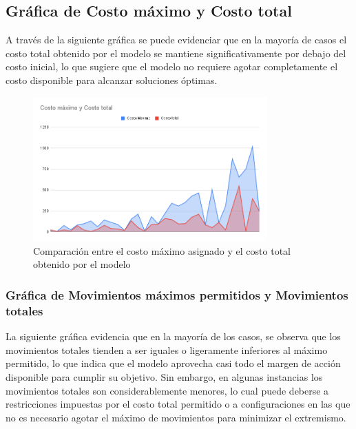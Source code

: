 \documentclass[11pt,letter]{article}
\begin{document}
\subsection{Gráfica de Costo máximo y Costo total}

A través de la siguiente gráfica se puede evidenciar que en la mayoría de casos el costo total obtenido por el modelo se mantiene significativamente por debajo del costo inicial, lo que sugiere que el modelo no requiere agotar completamente el costo disponible para alcanzar soluciones óptimas.

\begin{figure}[H]
    \centering
    \includegraphics[width=0.8\textwidth]{resources/costomaximoycostototal.png}
    \caption{Comparación entre el costo máximo asignado y el costo total obtenido por el modelo}
\end{figure}


\subsubsection*{Gráfica de Movimientos máximos permitidos y Movimientos totales}
La siguiente gráfica evidencia  que en la mayoría de los casos, se observa que los movimientos totales tienden a ser iguales o ligeramente inferiores al máximo permitido, lo que indica que el modelo aprovecha casi todo el margen de acción disponible para cumplir su objetivo. Sin embargo, en algunas instancias los movimientos totales son considerablemente menores, lo cual puede deberse a restricciones impuestas por el costo total permitido o a configuraciones en las que no es necesario agotar el máximo de movimientos para minimizar el extremismo. 
\end{document}
